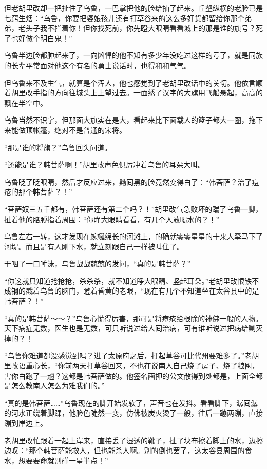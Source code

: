 但老胡里改却一把扯住了乌鲁，一巴掌把他的脸给抽了起来。丘壑纵横的老脸已是七窍生烟：“乌鲁，你要把婆娘孩儿还有打草谷来的这么多好货都留给你那个弟弟，老头子我不拦着你！但你找死前，你先瞪大眼睛看看城上的那是谁的旗号？死了也好做个明白鬼！”

乌鲁半边脸都肿起来了，一向凶悍的他不知有多少年没吃过这样的亏了，就是同族的长辈平常面对他这个有名的勇士说话时，也得和和气气。

但乌鲁来不及生气，就算是个浑人，他也感觉到了老胡里改话中的关切。他依言顺着胡里改手指的方向往城头上上望过去。一面绣了汉字的大旗用飞船悬起，高高的飘在半空中。

乌鲁当然不识字，但那面大旗实在是大，看起来比下面载人的篮子都大一圈，拖下来能做顶帐篷，绝对不是普通的宋将。

“那是谁的将旗？”乌鲁回头问道。

“还能是谁？韩菩萨啊！”胡里改声色俱厉冲着乌鲁的耳朵大叫。

乌鲁眨了眨眼睛，然后才反应过来，黝囘黑的脸竟然变得白了：“韩菩萨？治了痘疮的那个韩菩萨？！”

“菩萨奴三五千都有，韩菩萨还有第二个吗？！”胡里改气急败坏的踹了乌鲁一脚，扯着他的胳膊指着周围：“你睁大眼睛看看，有几个人敢喝水的？！”

乌鲁左右一转，这才发现在蜿蜒绵长的河滩上，的确就零零星星的十来人牵马下了河堤。而且是有人刚下水，就立刻跟自己一样被叫住了。

干咽了一口唾沫，乌鲁战战兢兢的发问，“真的是韩菩萨？”

“你这就只知道抢抢抢，杀杀杀，就不知道睁大眼睛、竖起耳朵。”老胡里改恨铁不成钢的戳着乌鲁的脑门，瞪着昏黄的老眼，“现在有几个不知道坐在太谷县中的是韩菩萨？！”

“真的是韩菩萨～～？”乌鲁心慌得厉害，那可是将痘疮给根除的神佛一般的人物。天下病症无数，医生也是无数，可只听说过给人囘治病，可有谁听说过把病给剿灭掉的？！

“乌鲁你难道都没感觉到吗？进了太原府之后，打起草谷可比代州要难多了。”老胡里改语重心长，“你前两天打草谷回来，不也在说南人自己烧了房子、烧了粮囤，害你白跑了一趟？这都是韩菩萨做的。他签名画押的公文散得到处都是，上面全都是怎么教南人怎么为难我们的。”

“真的是韩菩萨……”乌鲁现在的脚开始发软了，声音也在发抖。看看脚下，潺囘潺的河水正绕着脚踝，他脸色陡然一变，仿佛被炭火烫了一般，往后一蹦两蹦，直接蹦到岸边上。

老胡里改忙跟着一起上岸来，直接丢了湿透的靴子，扯了块布擦着脚上的水，边擦边叹：“那个韩菩萨能救人，但也能杀人啊。别的倒也罢了，这太谷县周围的食水，想要要命就别碰一星半点！”

